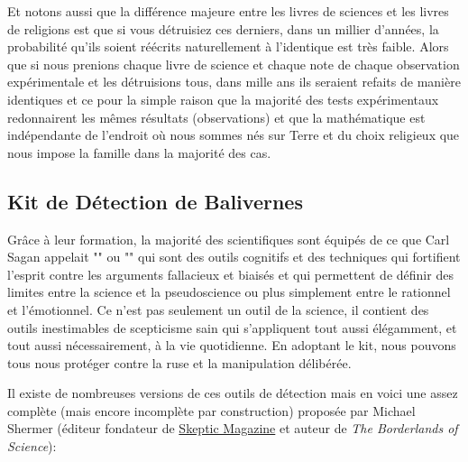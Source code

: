 	Et notons aussi que la différence majeure entre les livres de sciences et les livres de religions est que si vous détruisiez ces derniers, dans un millier d'années, la probabilité qu'ils soient réécrits naturellement à l'identique est très faible. Alors que si nous prenions chaque livre de science et chaque note de chaque observation expérimentale et les détruisions tous, dans mille ans ils seraient refaits de manière identiques et ce pour la simple raison que la majorité des tests expérimentaux redonnairent les mêmes résultats (observations) et que la mathématique est indépendante de l'endroit où nous sommes nés sur Terre et du choix religieux que nous impose la famille dans la majorité des cas.
	
	\subsection{Kit de Détection de Balivernes }
	Grâce à leur formation, la majorité des scientifiques sont équipés de ce que Carl Sagan appelait "" ou "" qui sont des outils cognitifs et des techniques qui fortifient l'esprit contre les arguments fallacieux et biaisés et qui permettent de définir des limites entre la science et la pseudoscience ou plus simplement entre le rationnel et l'émotionnel. Ce n'est pas seulement un outil de la science, il contient des outils inestimables de scepticisme sain qui s'appliquent tout aussi élégamment, et tout aussi nécessairement, à la vie quotidienne. En adoptant le kit, nous pouvons tous nous protéger contre la ruse et la manipulation délibérée.
	
	Il existe de nombreuses versions de ces outils de détection mais en voici une assez complète (mais encore incomplète par construction) proposée par Michael Shermer (éditeur fondateur de \href{http://www.skeptic.com}{Skeptic Magazine} et auteur de \textit{The Borderlands of Science}):
	
